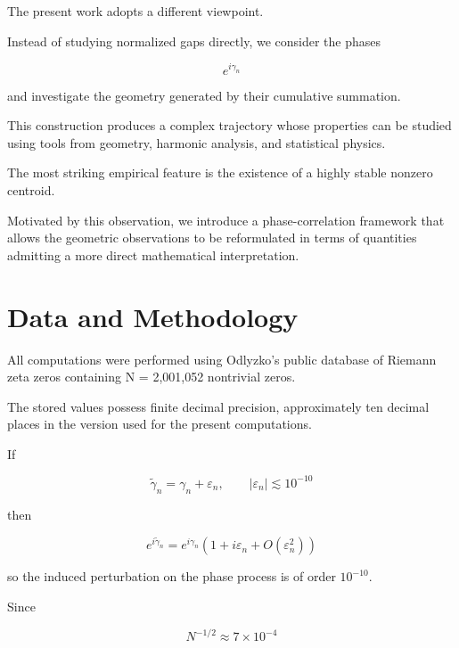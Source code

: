 \documentclass[11pt]{amsart}
\theoremstyle{definition}
\theoremstyle{remark}
\begin{document}
The present work adopts a different viewpoint.

Instead of studying normalized gaps directly,
we consider the phases

\begin{equation}
e^{i\gamma_n}
\label{eq:phase}
\end{equation}

and investigate the geometry generated by their cumulative
summation.

This construction produces a complex trajectory whose
properties can be studied using tools from geometry,
harmonic analysis, and statistical physics.

The most striking empirical feature is the existence of a
highly stable nonzero centroid.

Motivated by this observation, we introduce a
phase-correlation framework that allows the geometric
observations to be reformulated in terms of quantities
admitting a more direct mathematical interpretation.

\section{Data and Methodology}

All computations were performed using Odlyzko's public
database of Riemann zeta zeros containing 
N = 2,001,052 nontrivial zeros.

The stored values possess finite decimal precision,
approximately ten decimal places in the version used for
the present computations.

If

\begin{equation}
\tilde{\gamma}_n
=
\gamma_n+\varepsilon_n,
\qquad
|\varepsilon_n|
\lesssim
10^{-10}
\label{eq:perturbed_gamma}
\end{equation}

then

\begin{equation}
e^{i\tilde{\gamma}_n}
=
e^{i\gamma_n}
\left(
1+i\varepsilon_n
+
O(\varepsilon_n^2)
\right)
\label{eq:phase_perturbation}
\end{equation}

so the induced perturbation on the phase process is of
order \(10^{-10}\).

Since

\begin{equation}
N^{-1/2}
\approx
7\times10^{-4}
\label{eq:sqrtN}
\end{equation}
\end{document}
